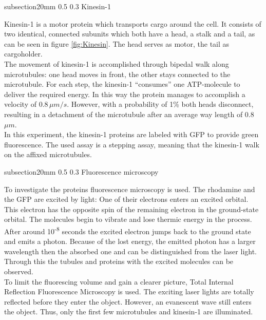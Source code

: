 \documentclass[english, %
parskip=full, %
bibliography=totoc, %
]{scrartcl}
\makeatletter
\renewcommand\subsection{\@startsection 
   {subsection}{2}{0mm}%
   {0.5\baselineskip}%
   {0.3\baselineskip}%
   {\bfseries\sffamily\large}%
   }
\makeatother
\begin{document}
\subsection{Kinesin-1}

Kinesin-1 is a motor protein which transports cargo around the cell. It consists of two identical, connected subunits which both have a head, a stalk and a tail, as can be seen in figure \ref{fig:Kinesin}. The head serves as motor, the tail as cargoholder. \\
The movement of kinesin-1 is accomplished through bipedal walk along microtubules: one head moves in front, the other stays connected to the microtubule. For each step, the kinesin-1 “consumes” one ATP-molecule to deliver the required energy. In this way the protein manages to accomplish a velocity of 0.8\,$\mu m/s$. However, with a probability of 1\% both heads disconnect, resulting in a detachment of the microtubule after an average way length of 0.8\,$\mu m$.\\
In this experiment, the kinesin-1 proteins are labeled with GFP to provide green fluorescence. The used assay is a stepping assay, meaning that the kinesin-1 walk on the affixed microtubules.

\subsection{Fluorescence microscopy}

To investigate the proteins fluorescence microscopy is used. The rhodamine and the GFP are excited by light: One of their electrons enters an excited orbital. This electron has the opposite spin of the remaining electron in the ground-state orbital. The molecules begin to vibrate and lose thermic energy in the process. After around 10\textsuperscript{-8} seconds the excited electron jumps back to the ground state and emits a photon. Because of the lost energy, the emitted photon has a larger wavelength then the absorbed one and can be distinguished from the laser light. Through this the tubules and proteins with the excited molecules can be observed.\\
To limit the fluorescing volume and gain a clearer picture, Total Internal Reflection Fluorescence Microscopy is used. The exciting laser lights are totally reflected before they enter the object. However, an evanescent wave still enters the object. Thus, only the first few microtubules and kinesin-1 are illuminated.
\end{document}

